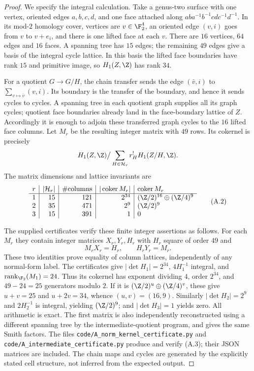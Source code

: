 \begin{proof}
We specify the integral calculation. Take a genus-two surface with
one vertex, oriented edges $a,b,c,d$, and one face attached along
$aba^{-1}b^{-1}cdc^{-1}d^{-1}$. In its mod-$2$ homology cover,
vertices are $v\in\F_2^4$, an oriented edge $(v,i)$ goes from
$v$ to $v+e_i$, and there is one lifted face at each $v$. There
are $16$ vertices, $64$ edges and $16$ faces. A spanning tree has
$15$ edges; the remaining $49$ edges give a basis of the integral
cycle lattice. In this basis the lifted face boundaries have rank
$15$ and primitive image, so $H_1(Z,\Z)$ has rank $34$.

For a quotient $G\to G/H$, the chain transfer sends the edge
$(\bar v,i)$ to $\sum_{v\mapsto\bar v}(v,i)$.
Its boundary is the transfer of the boundary, and hence it sends
cycles to cycles. A spanning tree in each quotient graph supplies
all its graph cycles; quotient face boundaries already land in the
face-boundary lattice of $Z$. Accordingly it is enough to adjoin
these transferred graph cycles to the $16$ lifted face columns.
Let $M_r$ be the resulting integer matrix with $49$ rows. Its
cokernel is precisely
\[
 H_1(Z,\Z)\big/\sum_{H\in\mathcal H_r}r_H^!H_1(Z/H,\Z).
\]
The matrix dimensions and lattice invariants are
\[
\begin{array}{c|r|r|r|l}
 r&|\mathcal H_r|&\#\text{columns}&|\operatorname{coker}M_r|
     &\operatorname{coker}M_r\\\hline
 1&15&121&2^{34}&(\Z/2)^{16}\oplus(\Z/4)^9\\
 2&35&471&2^9&(\Z/2)^9\\
 3&15&391&1&0
\end{array}                                                        \tag{A.2}
\]

The supplied certificates verify these finite integer assertions as
follows. For each $M_r$ they contain integer matrices $X_r,Y_r,H_r$
with $H_r$ square of order $49$ and
\[
 M_rX_r=H_r,\qquad H_rY_r=M_r.                                     \tag{A.3}
\]
These two identities prove equality of column lattices, independently
of any normal-form label. The certificates give
$|\det H_1|=2^{34}$, $4H_1^{-1}$ integral, and
$\operatorname{rank}_{\F_2}(M_1)=24$.
Thus its cokernel has exponent dividing $4$, order $2^{34}$, and
$49-24=25$ generators modulo $2$. If it is
$(\Z/2)^u\oplus(\Z/4)^v$, these give $u+v=25$ and $u+2v=34$,
whence $(u,v)=(16,9)$. Similarly
$|\det H_2|=2^9$ and $2H_2^{-1}$ is integral, yielding
$(\Z/2)^9$; and $|\det H_3|=1$ yields zero. All arithmetic is
exact. The first matrix is also independently reconstructed using
a different spanning tree by the intermediate-quotient program,
and gives the same Smith factors. The files
\texttt{code/A\_norm\_kernel\_certificate.py} and
\texttt{code/A\_intermediate\_certificate.py} produce and verify
(A.3); their JSON matrices are included. The chain maps and cycles
are generated by the explicitly stated cell structure, not
inferred from the expected output.


\end{proof}
